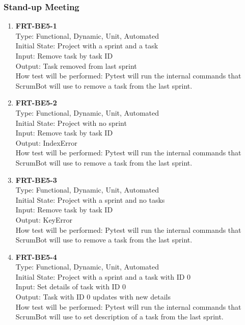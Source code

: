\documentclass[12pt, titlepage]{article}
\begin{document}
\subsubsection{Stand-up Meeting}
\begin{enumerate}
    \item{\textbf{FRT-BE5-1}}\\
    Type: Functional, Dynamic, Unit, Automated\\
    Initial State: Project with a sprint and a task\\
    Input: Remove task by task ID\\
    Output: Task removed from last sprint\\
    How test will be performed: Pytest will run the internal commands that ScrumBot will use to remove a task from the last sprint.
    
    \item{\textbf{FRT-BE5-2}}\\
    Type: Functional, Dynamic, Unit, Automated\\
    Initial State: Project with no sprint\\
    Input: Remove task by task ID\\
    Output: IndexError\\
    How test will be performed: Pytest will run the internal commands that ScrumBot will use to remove a task from the last sprint.
    
    \item{\textbf{FRT-BE5-3}}\\
    Type: Functional, Dynamic, Unit, Automated\\
    Initial State: Project with a sprint and no tasks\\
    Input: Remove task by task ID\\
    Output: KeyError\\
    How test will be performed: Pytest will run the internal commands that ScrumBot will use to remove a task from the last sprint.
    
    \item{\textbf{FRT-BE5-4}}\\
    Type: Functional, Dynamic, Unit, Automated\\
    Initial State: Project with a sprint and a task with ID 0\\
    Input: Set details of task with ID 0\\
    Output: Task with ID 0 updates with new details\\
    How test will be performed: Pytest will run the internal commands that ScrumBot will use to set description of a task from the last sprint.
    

\end{enumerate}
\end{document}

